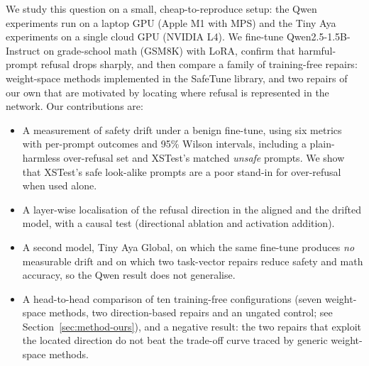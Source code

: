 \documentclass[conference]{IEEEtran}
\begin{document}
We study this question on a small, cheap-to-reproduce setup: the Qwen experiments run on a laptop GPU (Apple M1 with MPS) and the Tiny Aya experiments on a single cloud GPU (NVIDIA L4). We fine-tune Qwen2.5-1.5B-Instruct on grade-school math (GSM8K) with LoRA, confirm that harmful-prompt refusal drops sharply, and then compare a family of training-free repairs: weight-space methods implemented in the SafeTune library, and two repairs of our own that are motivated by locating where refusal is represented in the network. Our contributions are:
\begin{itemize}
\item A measurement of safety drift under a benign fine-tune, using six metrics with per-prompt outcomes and 95\% Wilson intervals, including a plain-harmless over-refusal set and XSTest's matched \emph{unsafe} prompts. We show that XSTest's safe look-alike prompts are a poor stand-in for over-refusal when used alone.
\item A layer-wise localisation of the refusal direction in the aligned and the drifted model, with a causal test (directional ablation and activation addition).
\item A second model, Tiny Aya Global, on which the same fine-tune produces \emph{no} measurable drift and on which two task-vector repairs reduce safety and math accuracy, so the Qwen result does not generalise.
\item A head-to-head comparison of ten training-free configurations (seven weight-space methods, two direction-based repairs and an ungated control; see Section~\ref{sec:method-ours}), and a negative result: the two repairs that exploit the located direction do not beat the trade-off curve traced by generic weight-space methods.
\end{itemize}
\end{document}
